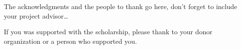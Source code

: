 \documentclass[
11pt, %
english, %
singlespacing, %
headsepline, %
openany
]{MastersDoctoralThesis} %
\begin{document}
\begin{acknowledgements}
	\addchaptertocentry{\acknowledgementname} %
	The acknowledgments and the people to thank go here, don't forget to include your project advisor\ldots

	\noindent If you was supported with the scholarship, please thank to your donor organization or a person who supported you.
\end{acknowledgements}


\tableofcontents %

\listoffigures %

\listoftables %


%
%


%
%
%

\end{document}
